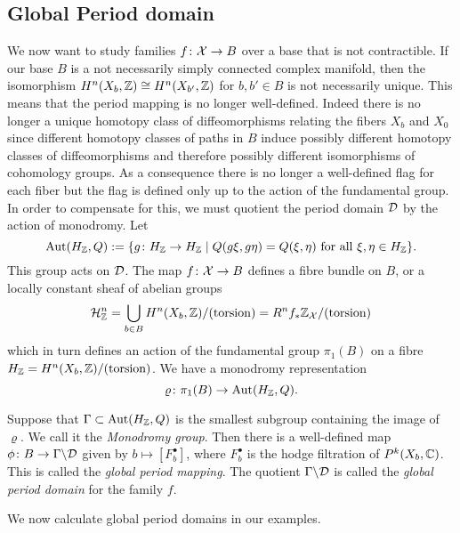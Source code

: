 \documentclass[../main.tex]{subfiles}
\begin{document}
\subsection{Global Period domain} \label{sect:globmap}

We now want to study families $f\colon \mathcal{X} \to B$ over a base that is not contractible. 
If our base $B$ is a not necessarily simply connected complex manifold, then the isomorphism $H^n(X_b,\mathbb{Z}) \cong H^n(X_{b'},\mathbb{Z})$ for $b,b' \in B$ is not necessarily unique.
This means that the period mapping is no longer well-defined.
Indeed there is no longer a unique homotopy class of diffeomorphisms relating the fibers $X_b$ and $X_0$ since different homotopy classes of paths in $B$ induce possibly different homotopy classes of diffeomorphisms and therefore possibly different isomorphisms of cohomology groups. As a consequence there is no longer a well-defined flag for each fiber but the flag is defined only up to the action of the fundamental group.
In order to compensate for this, we must quotient the period domain $\mathcal{D}$ by the action of monodromy.
Let
\begin{equation} \label{Geq} \mathrm{Aut}(H_{\ZZ},Q) := \{g\colon H_{\Z} \to H_{\Z} \mid Q(g\xi, g\eta) = Q(\xi, \eta)\ \mathrm{for}\ \mathrm{all}\ \xi,\eta \in  H_{\Z}\}.\end{equation}
This group acts on $\mathcal{D}$. The map $f\colon \mathcal{X} \to B$ defines a fibre bundle on $B$, or a locally constant sheaf of abelian groups
\[\mathcal{H}_{\mathbb{Z}}^n = \bigcup_{b \in B} H^n(X_b,\mathbb{Z}) / (\text{torsion}) = R^nf_*\mathbb{Z}_{\mathcal{X}} / (\text{torsion}) \] 
which in turn defines an action of the fundamental group $\pi_1(B)$ on a fibre $H_{\mathbb{Z}} = H^n(X_b,\mathbb{Z}) / (\text{torsion})$.
We have a monodromy representation
\[\varrho \colon \pi_1(B) \to \mathrm{Aut}(H_{\mathbb{Z}},Q).\]

Suppose that $\Gamma \subset \mathrm{Aut}(H_{\mathbb{Z}},Q)$ is the smallest subgroup containing the image of $\varrho$. We call it the \emph{Monodromy group}. Then there is a well-defined map $\phi\colon B \to \Gamma \backslash \mathcal{D}$ given by $b \mapsto [F^\bullet_b]$, where $F^\bullet_b$ is the hodge filtration of $P^k(X_b, \mathbb{C})$.
This is called the \emph{global period mapping}. The quotient $ \Gamma \backslash \mathcal{D}$ is called the \emph{global period domain} for the family $f$.

We now calculate global period domains in our examples.
\end{document}
